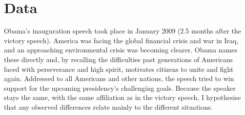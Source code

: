 \documentclass[11pt]{article}
\begin{document}
\section{Data}{
	Obama's inauguration speech took place in January 2009 (2.5 months after the victory speech).
	America was facing the global financial crisis and war in Iraq, and an approaching environmental crisis was becoming clearer.
	Obama names these directly and, by recalling the difficulties past generations of Americans faced with perseverance and high spirit, 
	motivates citizens to unite and fight again.
	Addressed to all Americans and other nations, the speech tried to win support for the upcoming presidency's challenging goals.
	Because the speaker stays the same, with the same affiliation as in the victory speech, I hypothesise that any observed differences relate mainly to the different situations.

}

\end{document}
